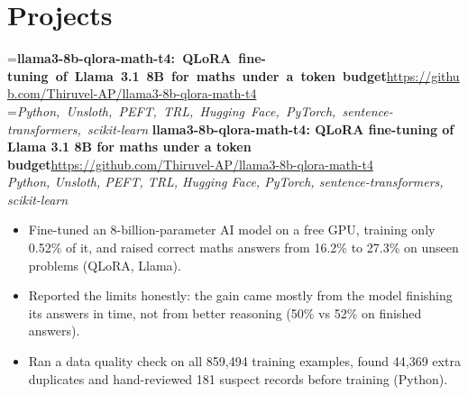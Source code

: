 \documentclass[a4paper,11pt]{article}
\newcommand{\project}[3]{%
  \textbf{#1}\hfill#3\\ {\color{muted}\small\textit{#2}}\par}
\begin{document}
\section{Projects}
=\hbox{\textbf{llama3-8b-qlora-math-t4: QLoRA fine-tuning of Llama 3.1 8B for maths under a token budget}\hspace{1em}\url{https://github.com/Thiruvel-AP/llama3-8b-qlora-math-t4}}%
=\hbox{{\small\textit{Python, Unsloth, PEFT, TRL, Hugging Face, PyTorch, sentence-transformers, scikit-learn}}}%
\ifdim\wd0>\linewidth
\ifdim\wd2>\linewidth
\textbf{llama3-8b-qlora-math-t4: QLoRA fine-tuning of Llama 3.1 8B for maths under a token budget}\\ {\color{muted}\small\textit{Python, Unsloth, PEFT, TRL, Hugging Face, PyTorch, sentence-transformers, scikit-learn}}\\ \hspace*{\fill}{\small\url{https://github.com/Thiruvel-AP/llama3-8b-qlora-math-t4}}\par
\else
\textbf{llama3-8b-qlora-math-t4: QLoRA fine-tuning of Llama 3.1 8B for maths under a token budget}\\ {\color{muted}\small\textit{Python, Unsloth, PEFT, TRL, Hugging Face, PyTorch, sentence-transformers, scikit-learn}}\hfill{\small\url{https://github.com/Thiruvel-AP/llama3-8b-qlora-math-t4}}\par
\fi
\else
\project{llama3-8b-qlora-math-t4: QLoRA fine-tuning of Llama 3.1 8B for maths under a token budget}{Python, Unsloth, PEFT, TRL, Hugging Face, PyTorch, sentence-transformers, scikit-learn}{\url{https://github.com/Thiruvel-AP/llama3-8b-qlora-math-t4}}
\fi
\begin{itemize}
  \item Fine-tuned an 8-billion-parameter AI model on a free GPU, training only 0.52\% of it, and raised correct maths answers from 16.2\% to 27.3\% on unseen problems (QLoRA, Llama).
  \item Reported the limits honestly: the gain came mostly from the model finishing its answers in time, not from better reasoning (50\% vs 52\% on finished answers).
  \item Ran a data quality check on all 859,494 training examples, found 44,369 extra duplicates and hand-reviewed 181 suspect records before training (Python).
\end{itemize}
\end{document}
